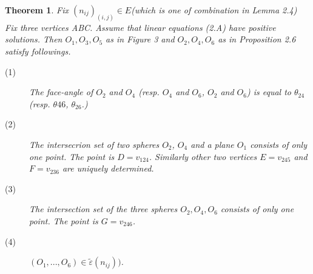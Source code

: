 \documentclass[dvipdfmx]{interact}
\theoremstyle{plain}%
\newtheorem{theorem}{Theorem}[section]
\theoremstyle{definition}
\theoremstyle{remark}
\theoremstyle{problemstyle}
\begin{document}
\begin{theorem}
 Fix $(n_{ij})_(i, j)\in E$(which is one of combination in Lemma 2.4)
 Fix three vertices ABC. Assume that linear equations (2.A) have
 positive solutions. Then $O_1, O_3, O_5$ as in Figure 3 and $O_2, O_4,
 O_6$ as in Proposition 2.6 satisfy followings.
 \begin{description}
  \item[(1)] The face-angle of $O_2$ and $O_4$ (resp. $O_4$ and $O_6$,
             $O_2$ and $O_6$) is equal to $\theta_{24}$
             (resp. $\theta{46}$, $\theta_{26}$.)
  \item[(2)] The intersecrion set of two spheres $O_2$, $O_4$ and a plane
             $O_1$ consists of only one point. The point is 
             $D = v_{124}$. Similarly other two vertices $E = v_{245}$
             and $F = v_{236}$ are uniquely determined.
  \item[(3)] The intersection set of the three spheres $O_2, O_4, O_6$
             consists of only one point. The point is $G = v_{246}$.
             
  \item[(4)] $(O_1, ..., O_6) \in \tilde\varepsilon(n_{ij}))$.
\end{description}
\end{theorem}
\end{document}

